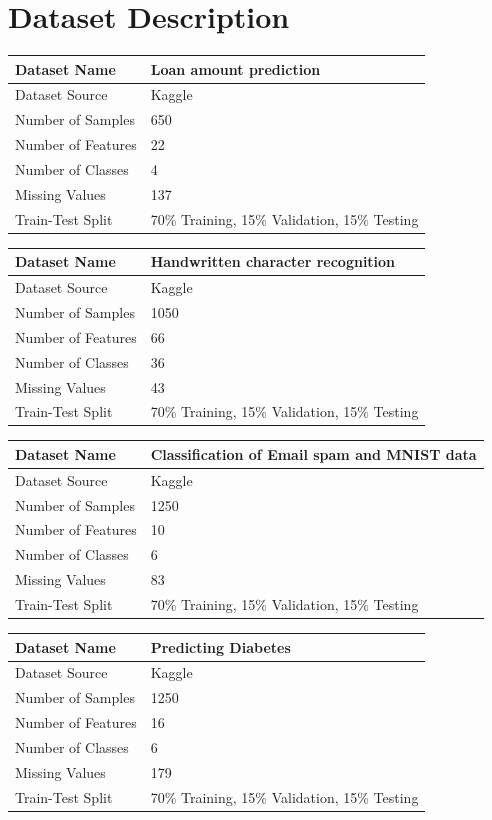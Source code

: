 \documentclass[12pt,a4paper]{article}
\begin{document}
\section{Dataset Description}
\begin{longtable}{|p{6cm}|p{8cm}|}
\hline
Dataset Name & Loan amount prediction\\ \hline
Dataset Source & Kaggle\\ \hline
Number of Samples & 650\\ \hline
Number of Features & 22\\ \hline
Number of Classes & 4\\ \hline
Missing Values &  137\\ \hline
Train-Test Split & 70\% Training, 15\% Validation, 15\% Testing \\ \hline
\end{longtable}

\begin{longtable}{|p{6cm}|p{8cm}|}
\hline
Dataset Name & Handwritten character recognition\\ \hline
Dataset Source & Kaggle\\ \hline
Number of Samples & 1050\\ \hline
Number of Features & 66\\ \hline
Number of Classes & 36\\ \hline
Missing Values & 43\\ \hline
Train-Test Split & 70\% Training, 15\% Validation, 15\% Testing \\ \hline
\end{longtable}

\begin{longtable}{|p{6cm}|p{8cm}|}
\hline
Dataset Name & Classification of Email spam and MNIST data\\ \hline
Dataset Source & Kaggle\\ \hline
Number of Samples & 1250\\ \hline
Number of Features & 10\\ \hline
Number of Classes & 6\\ \hline
Missing Values & 83\\ \hline
Train-Test Split & 70\% Training, 15\% Validation, 15\% Testing \\ \hline
\end{longtable}

\begin{longtable}{|p{6cm}|p{8cm}|}
\hline
Dataset Name & Predicting Diabetes\\ \hline
Dataset Source & Kaggle\\ \hline
Number of Samples & 1250\\ \hline
Number of Features & 16\\ \hline
Number of Classes & 6\\ \hline
Missing Values & 179\\ \hline
Train-Test Split & 70\% Training, 15\% Validation, 15\% Testing \\ \hline
\end{longtable}
\end{document}
